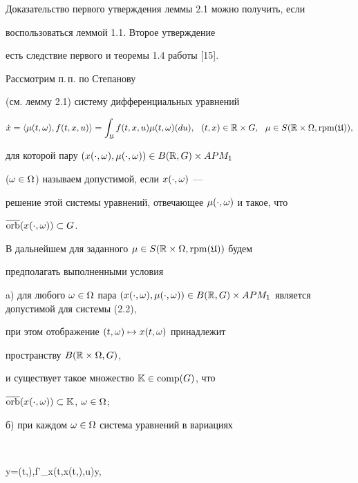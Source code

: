 Доказательство первого утверждения леммы 2.1 можно получить, если


воспользоваться леммой 1.1. Второе утверждение


есть следствие первого и теоремы 1.4 работы [15].





Рассмотрим п.\,п. по Степанову


(см. лемму 2.1) систему дифференциальных уравнений


\begin{equation}


\Dot x=\la\mu(t,\om),f(t,x,u)\ra=\int_{\frak U}


f(t,x,u)\mu(t,\om)(du),\ \


(t,x)\in\R\times G,\ \ \mu\in S(\R\times\Om,\rpm(\frak U)),


\end{equation}


для которой пару $(x(\cdot,\omega),\mu(\cdot,\omega))\in B(\Bbb R,G)\times APM_{1}$


($\omega\in\Omega$) называем допустимой, если $x(\cdot,\omega)$ ---


решение этой системы уравнений, отвечающее $\mu(\cdot,\omega)$ и такое, что


$\overline{\operatorname{orb}}(x(\cdot,\omega))\subset G$.





В дальнейшем для заданного $\mu\in S(\Bbb R\times\Omega,\operatorname{rpm}(\frak U))$ будем


предполагать выполненными условия





a) для любого $\om\in\Om$ пара $(x(\cdot,\om),\mu(\cdot,\om))\in


B(\R,G)\times APM_{1}$ является допустимой для системы (2.2),


при этом отображение $(t,\omega)\mapsto x(t,\omega)$ принадлежит


пространству $B(\Bbb R\times\Omega,G)$,


и существует такое множество $\Bbb K\in \operatorname{comp}(G)$, что


$\overline{\operatorname{orb}}(x(\cdot,\omega))\subset\Bbb K$, $\omega\in\Omega$;





б) при каждом $\omega\in\Omega$ система уравнений в вариациях


$$


\Dot y=\la\mu(t,\om),f'_{x}(t,x(t,\om),u)\ra y,


